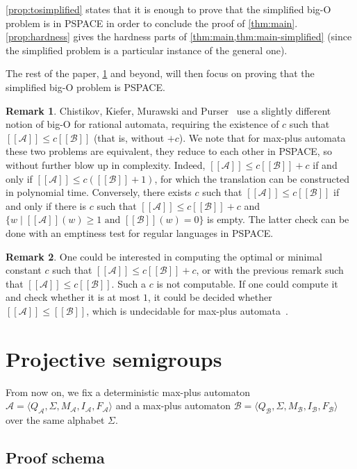 \documentclass[10pt,a4paper]{amsart}
\theoremstyle{definition}
\newtheorem{rem}[rem]{Remark}
\numberwithin{equation}{section}
\theoremstyle{remark}
\newcommand{\autA}{\mathcal{A}}
\newcommand{\autB}{\mathcal{B}}
\newcommand{\brfunc}[1]{[\![#1]\!]}
\newcommand{\funcA}{\brfunc{\autA}}
\newcommand{\funcB}{\brfunc{\autB}}
\theoremstyle{remark}
\begin{document}
\cref{prop:tosimplified} states that it is enough to prove that the simplified big-O problem is in PSPACE in order to conclude the proof of \cref{thm:main}. \cref{prop:hardness} gives the hardness parts of \cref{thm:main,thm:main-simplified} (since the simplified problem is a particular instance of the general one).
 
The rest of the paper, \cref{section:projection} and beyond, will then focus on proving that the simplified big-O problem is PSPACE.

\begin{rem}\label{remark:bigowithoutplusc}
Chistikov, Kiefer, Murawski and Purser~\cite{ChistikovKMP22} use a slightly different notion of big-O for rational automata, requiring the existence of $c$ such that $\funcA \le c \funcB$ (that is, without $+c$). We note that for max-plus automata these two problems are equivalent, they reduce to each other in PSPACE, so without further blow up in complexity.
Indeed, $\funcA \le c\funcB+c$ if and only if $\funcA \le c(\funcB+1)$, for which the translation can be constructed in polynomial time.
Conversely, there exists $c$ such that $\funcA \le c\funcB$ if and only if there is $c$ such that $\funcA \le c\funcB+ c$ and $\{w \mid \funcA(w) \ge 1 \text{ and } \funcB(w) = 0\}$ is empty. The latter check can be done with an emptiness test for regular languages in PSPACE.
\end{rem}
\begin{rem}
One could be interested in computing the optimal or minimal constant $c$ such that $\funcA \le c\funcB + c$, or with the previous remark such that  $\funcA \le c\funcB$. Such a $c$ is not computable. If one could compute it and check whether it is at most $1$, it could be decided whether $\funcA \le \funcB$, which is undecidable for max-plus automata~\cite{Krob94}.
\end{rem}

\section{Projective semigroups}
\label{section:projection}

From now on, we fix a deterministic max-plus automaton $\autA = \langle Q_\autA, \Sigma, M_\autA, I_\autA, F_\autA\rangle$ and a max-plus automaton $\autB = \langle Q_\autB, \Sigma, M_\autB, I_\autB, F_\autB\rangle$ over the same alphabet $\Sigma$.

\subsection{Proof schema}
\end{document}
